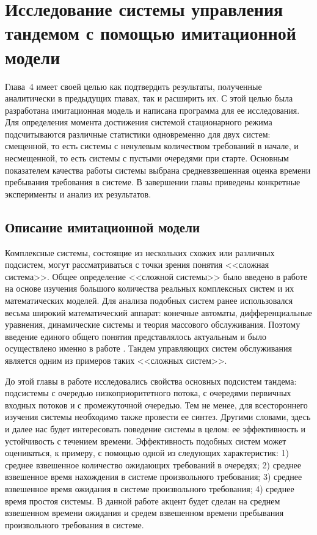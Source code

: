 \chapter{Исследование системы управления тандемом с помощью имитационной модели}						%

Глава~4 имеет своей целью как подтвердить результаты, полученные аналитически в предыдущих главах, так и расширить их. С этой целью была разработана имитационная модель и написана программа для ее исследования. Для определения момента достижения системой стационарного режима подсчитываются различные статистики одновременно для двух систем: смещенной, то есть системы с ненулевым количеством требований в начале, и несмещенной, то есть системы с пустыми очередями при старте. Основным показателем качества работы системы выбрана средневзвешенная оценка времени пребывания требования в системе. В завершении главы приведены конкретные эксперименты и анализ их результатов.

\section{Описание имитационной модели}
Комплексные системы, состоящие из нескольких схожих или различных подсистем, могут рассматриваться с точки зрения понятия <<сложная система>>. Общее определение <<сложной системы>> было введено в работе \cite{Buslenko:1978} на основе изучения большого количества реальных комплексных систем и их математических моделей. Для анализа подобных систем ранее использовался весьма широкий математический аппарат: конечные автоматы, дифференциальные уравнения, динамические системы и теория массового обслуживания. Поэтому введение единого общего понятия представлялось актуальным и было осуществлено именно в работе \cite{Buslenko:1978}. Тандем управляющих систем обслуживания является одним из примеров таких <<сложных систем>>. 

До этой главы в работе исследовались свойства основных подсистем тандема: подсистемы с очередью низкоприоритетного потока, с очередями первичных входных потоков и с промежуточной очередью. Тем не менее, для всестороннего изучения системы необходимо также провести ее синтез. Другими словами, здесь и далее нас будет интересовать поведение системы в целом: ее эффективность и устойчивость с течением времени. Эффективность подобных систем может оцениваться, к примеру, с помощью одной из следующих характеристик: 1) среднее взвешенное количество ожидающих требований в очередях; 2) среднее взвешенное время нахождения в системе произвольного требования; 3) среднее взвешенное время ожидания в системе произвольного требования; 4) среднее время простоя системы. В данной работе акцент будет сделан на среднем взвешенном времени ожидания и средем взвешенном времени пребывания произвольного требования в системе.

